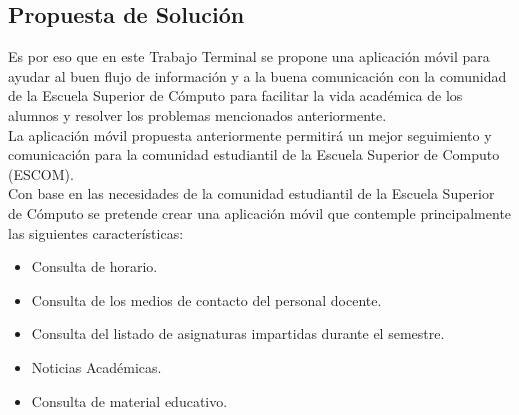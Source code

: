 	\subsection{Propuesta de Solución}
	
	Es por eso que en este Trabajo Terminal se propone una aplicación móvil para ayudar al buen flujo de información y a la buena comunicación con la comunidad de la Escuela Superior de Cómputo para facilitar la vida académica de los alumnos y resolver los problemas mencionados anteriormente.\\
	
	La aplicación móvil propuesta anteriormente permitirá un mejor seguimiento y comunicación para la comunidad estudiantil de la Escuela Superior de Computo (ESCOM).\\
	
	Con base en las necesidades de la comunidad estudiantil de la Escuela Superior de Cómputo se pretende crear una aplicación móvil que contemple principalmente las siguientes características:
	\begin{itemize}
		\item Consulta de horario.
		\item Consulta de los medios de contacto del personal docente.
		\item Consulta del listado de asignaturas impartidas durante el semestre.
		\item Noticias Académicas.
		\item  Consulta de material educativo.
	\end{itemize}

